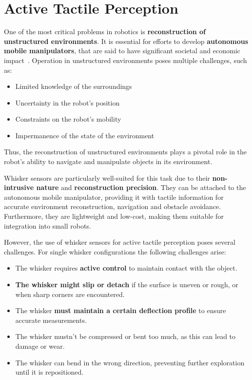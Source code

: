 \section{Active Tactile Perception}
One of the most critical problems in robotics is \textbf{reconstruction of unstructured environments}.
It is essential for efforts to develop \textbf{autonomous mobile manipulators}, that are said to have significant societal and economic impact~\cite{how-can-robots-succeed}.
Operation in unstructured environments poses multiple challenges, such as:~\cite{how-can-robots-succeed}
\begin{itemize}
    \item Limited knowledge of the surroundings
    \item Uncertainty in the robot's position
    \item Constraints on the robot's mobility
    \item Impermanence of the state of the environment
\end{itemize}
Thus, the reconstruction of unstructured environments plays a pivotal role in the robot's ability to navigate and manipulate objects in its environment.

Whisker sensors are particularly well-suited for this task due to their \textbf{non-intrusive nature} and \textbf{reconstruction precision}.
They can be attached to the autonomous mobile manipulator, providing it with tactile information for accurate environment reconstruction, navigation and obstacle avoidance.
Furthermore, they are lightweight and low-cost, making them suitable for integration into small robots.

However, the use of whisker sensors for active tactile perception poses several challenges.
For single whisker configurations the following challenges arise:
\begin{itemize}
    \item The whisker requires \textbf{active control} to maintain contact with the object.
    \item \textbf{The whisker might slip or detach} if the surface is uneven or rough, or when sharp corners are encountered.
    \item The whisker \textbf{must maintain a certain deflection profile} to ensure accurate measurements.
    \item The whisker mustn't be compressed or bent too much, as this can lead to damage or wear.
    \item The whisker can bend in the wrong direction, preventing further exploration until it is repositioned.
\end{itemize}

